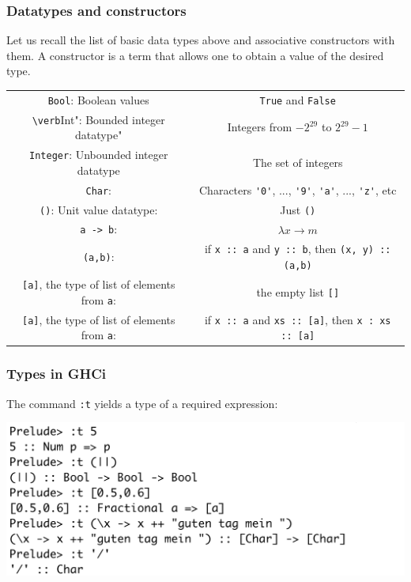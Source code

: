 \documentclass[10pt,pdf,utf8,russian,aspectratio=169]{beamer}
\begin{document}
\begin{frame}
  \frametitle{Datatypes and constructors}
 Let us recall the list of basic data types above and associative constructors with them. A constructor is a term that allows one to obtain a value of the desired type.
\begin{center}
\begin{tabular}{ |c|c| }
\hline
\verb"Bool": Boolean values & \verb"True" and \verb"False" \\
\verb"\verb"Int": Bounded integer datatype" & Integers from $-2^{29}$ to $2^{29} - 1$ \\
\verb"Integer": Unbounded integer datatype & The set of integers \\
\verb"Char": & Characters \verb"'0'", ..., \verb"'9'", \verb"'a'", ..., \verb"'z'", etc \\
\verb"()": Unit value datatype: & Just \verb"()" \\
\verb"a -> b": & $\lambda x \rightarrow m$ \\
\verb"(a,b)": & if \verb"x :: a" and \verb"y :: b", then \verb"(x, y) :: (a,b)" \\
\verb"[a]", the type of list of elements from \verb"a": & the empty list \verb"[]" \\
\verb"[a]", the type of list of elements from \verb"a": & if \verb"x :: a" and \verb"xs :: [a]", then \verb"x : xs :: [a]" \\
\hline
\end{tabular}
\end{center}
\end{frame}

\begin{frame}
  \frametitle{Types in GHCi}

  The command \verb":t" yields a type of a required expression:

  \begin{center}
  \includegraphics[scale=0.5]{Pics/TypesScreen.png}
  \end{center}

\end{frame}
\end{document}
